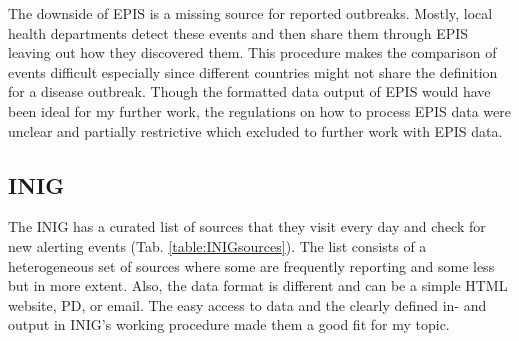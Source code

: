 The downside of EPIS is a missing source for reported outbreaks. Mostly, local health departments detect these events and then share them through EPIS leaving out how they discovered them. This procedure makes the comparison of events difficult especially since different countries might not share the definition for a disease outbreak.
Though the formatted data output of EPIS would have been ideal for my further work, the regulations on how to process EPIS data were unclear and partially restrictive which excluded to further work with EPIS data.

\subsection{INIG}\label{INIGsources}
The INIG has a curated list of sources that they visit every day and check for new alerting events (Tab. \ref{table:INIGsources}).
The list consists of a heterogeneous set of sources where some are frequently reporting and some less but in more extent. Also, the data format is different and can be a simple HTML website, PD, or email.
The easy access to data and the clearly defined in- and output in INIG's working procedure made them a good fit for my topic.
